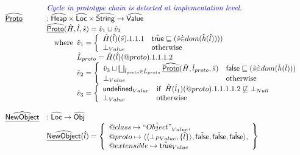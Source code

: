 \[\begin{array}{ll}
& {\color{blue} \textit{Cycle in prototype chain is detected at implementation level.}} \\
\widehat{\underline{\sf Proto}} & : \widehat{\mbox{\textsf{Heap}}} \times \widehat{\mbox{\textsf{Loc}}} \times \widehat{\mbox{\textsf{String}}} \rightarrow \widehat{\mbox{\textsf{Value}}}\\
  & \widehat{\underline{\sf Proto}}(\hat{H},\hat{l},\hat{s})
    =\hat{v}_1\sqcup\hat{v}_2\\
  & \quad{\rm where}\begin{array}[t]{l}
     \hat{v}_1 =
        \left\{
          \begin{array}{ll}
            \hat{H}(\hat{l})(\hat{s}).1.1.1
            & \hat{\mbox{\textsf{true}}}\sqsubseteq(\hat{s} \dot{\in} dom(\hat{h}(\hat{l}))))\\
            \bot_{Value} & {\rm otherwise} \\
          \end{array}
        \right.\\
      \hat{L}_{proto} = \hat{H}(\hat{l})(@proto).1.1.1.2\\
      \hat{v}_2 =
        \left\{
          \begin{array}{ll}
            \hat{v}_3 \sqcup \bigsqcup_{\hat{l}_{proto}\in\hat{L}_{proto}}\widehat{\underline{\sf Proto}}(\hat{H},\hat{l}_{proto},\hat{s})
            & \hat{\mbox{\textsf{false}}}\sqsubseteq(\hat{s} \dot{\in} dom(\hat{h}(\hat{l})))\\
            \bot_{Value} & {\rm otherwise} \\
          \end{array}
        \right.\\
    \hat{v}_3 =
      \left\{
      \begin{array}{ll}
        \hat{\mbox{\textsf{undefined}}}_{Value} & {\rm if}\begin{array}[t]{l}\hat{H}(\hat{l}_1)(@proto).1.1.1.1.2 \not\sqsubseteq \bot_{Null}\end{array}\\
        \bot_{Value} & {\rm otherwise}\\
      \end{array}
    \right.\\
    \end{array}\\
\\

\widehat{\underline{\sf NewObject}} & : \widehat{\mbox{\textsf{Loc}}} \rightarrow \widehat{\mbox{\textsf{Obj}}} \\
& \widehat{\underline{\sf NewObject}}(\hat{l}) = \left\{\begin{array}{l}@class\mapsto \hat{``Object"}_{Value},\\
  @proto\mapsto
   \langle \langle\bot_{PValue},\{\hat{l}\}\rangle,\hat{\mbox{\textsf{false}}},\hat{\mbox{\textsf{false}}},\hat{\mbox{\textsf{false}}} \rangle,\\
  @extensible\mapsto \hat{\mbox{\textsf{true}}}_{Value}
  \end{array}\right\}\\\\


\end{array}\]
